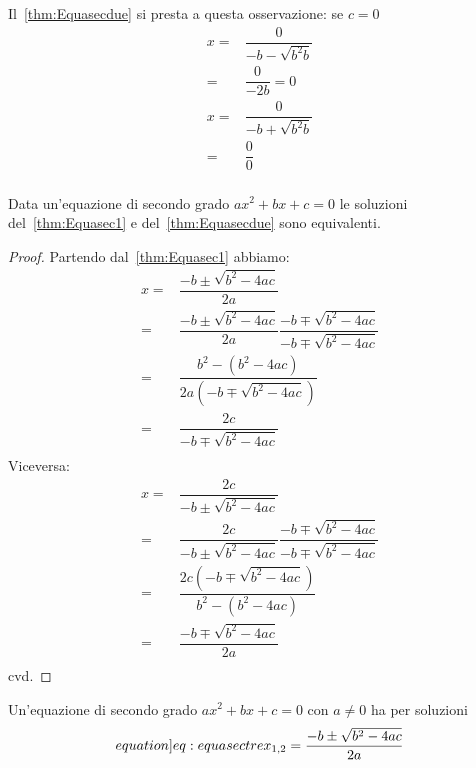 \begin{commento}
	Il~\vref{thm:Equasecdue} si presta a questa osservazione: se $c=0$
	\begin{align*}
		x=&\dfrac{0}{-b-\sqrt{b^2b}}\\
		=&\dfrac{0}{-2b}=0\\
		x=&\dfrac{0}{-b+\sqrt{b^2b}}\\
		=&\dfrac{0}{0}\\
	\end{align*}
\end{commento}
\begin{thm}[Equivalenza]
	Data un'equazione di secondo grado $ax^2+bx+c=0$ le soluzioni 
	del~\vref{thm:Equasec1} e del~\vref{thm:Equasecdue} sono equivalenti.
\end{thm}
\begin{proof}
	Partendo dal~\vref{thm:Equasec1} abbiamo:
	\begin{align*}
	 x=&\dfrac{-b\pm\sqrt{b^2-4ac}}{2a}\\
	=&\dfrac{-b\pm\sqrt{b^2-4ac}}{2a}\dfrac{-b\mp\sqrt{b^2-4ac}}{-b\mp\sqrt{b^2-4ac}}\\
	=&\dfrac{b^2-(b^2-4ac)}{2a(-b\mp\sqrt{b^2-4ac})}\\
	=&\dfrac{2c}{-b\mp\sqrt{b^2-4ac}}\\
	\end{align*}
Viceversa:
\begin{align*}
	x=&\dfrac{2c}{-b\pm\sqrt{b^2-4ac}}\\
	=&\dfrac{2c}{-b\pm\sqrt{b^2-4ac}}\dfrac{-b\mp\sqrt{b^2-4ac}}{-b\mp\sqrt{b^2-4ac}}\\
	=&\dfrac{2c(-b\mp\sqrt{b^2-4ac})}{b^2-(b^2-4ac)}\\
	=&\dfrac{-b\mp\sqrt{b^2-4ac}}{2a}\\
\end{align*}
cvd.
\end{proof}
\begin{thm}[Simmetria]\label{thm:Equasectre}
	Un'equazione di secondo grado $ax^2+bx+c=0$ con $a\neq 0$ ha per soluzioni 
	\begin{equation*}\label[equation]{eq:equasectre}
		x_{1,2}=\dfrac{-b\pm\sqrt{b^2-4ac}}{2a}
	\end{equation*}	
\end{thm}\cite{Mueller2021}
